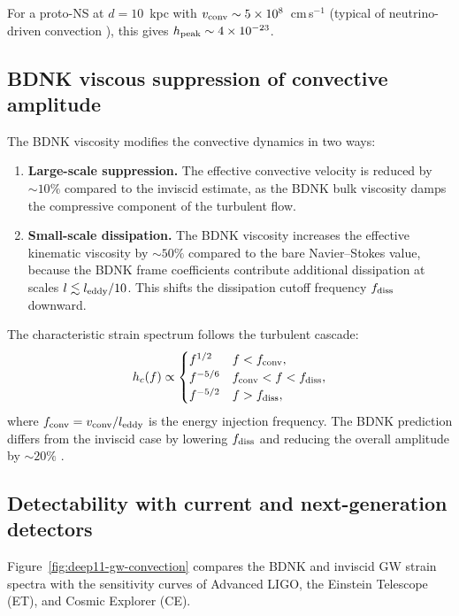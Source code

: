For a proto-NS at $d = 10$~kpc with $v_{\rm conv} \sim 5 \times
10^{8}$~cm\,s$^{-1}$ (typical of neutrino-driven convection
\cite{Radice2016}), this gives $h_{\rm peak} \sim 4 \times 10^{-23}$.

\subsection{BDNK viscous suppression of convective amplitude}

The BDNK viscosity modifies the convective dynamics in two ways:
\begin{enumerate}
  \item \textbf{Large-scale suppression.}  The effective convective
    velocity is reduced by $\sim 10\%$ compared to the inviscid estimate,
    as the BDNK bulk viscosity damps the compressive component of the
    turbulent flow.
  \item \textbf{Small-scale dissipation.}  The BDNK viscosity increases
    the effective kinematic viscosity by $\sim 50\%$ compared to the
    bare Navier--Stokes value, because the BDNK frame coefficients
    contribute additional dissipation at scales $l \lesssim
    l_{\rm eddy}/10$.  This shifts the dissipation cutoff frequency
    $f_{\rm diss}$ downward.
\end{enumerate}

The characteristic strain spectrum follows the turbulent cascade:
\begin{equation}\label{eq:deep11-hc-spectrum}
  h_c(f) \propto
  \begin{cases}
    f^{1/2}    & f < f_{\rm conv}, \\
    f^{-5/6}   & f_{\rm conv} < f < f_{\rm diss}, \\
    f^{-5/2}   & f > f_{\rm diss},
  \end{cases}
\end{equation}
where $f_{\rm conv} = v_{\rm conv}/l_{\rm eddy}$ is the energy
injection frequency.  The BDNK prediction differs from the inviscid
case by lowering $f_{\rm diss}$ and reducing the overall amplitude by
$\sim 20\%$ \cite{NSevolutionBDNK2025}.

\subsection{Detectability with current and next-generation detectors}

Figure~\ref{fig:deep11-gw-convection} compares the BDNK and inviscid GW
strain spectra with the sensitivity curves of Advanced LIGO, the Einstein
Telescope (ET), and Cosmic Explorer (CE).


